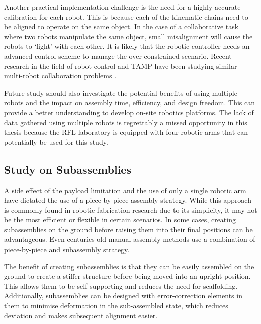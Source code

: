 Another practical implementation challenge is the need for a highly accurate calibration for each robot. This is because each of the kinematic chains need to be aligned to operate on the same object. In the case of a collaborative task where two robots manipulate the same object, small misalignment will cause the robots to ‘fight’ with each other. It is likely that the robotic controller needs an advanced control scheme to manage the over-constrained scenario. Recent research in the field of robot control and TAMP have been studying similar multi-robot collaboration problems \parencite{stroupeBehaviorbasedMultirobotCollaboration2005}.

Future study should also investigate the potential benefits of using multiple robots and the impact on assembly time, efficiency, and design freedom. This can provide a better understanding to develop on-site robotics platforms. The lack of data gathered using multiple robots is regrettably a missed opportunity in this thesis because the RFL laboratory is equipped with four robotic arms that can potentially be used for this study. 

\subsection{Study on Subassemblies}
\label{subsection:study-on-subassemblies}

A side effect of the payload limitation and the use of only a single robotic arm have dictated the use of a piece-by-piece assembly strategy. While this approach is commonly found in robotic fabrication research due to its simplicity, it may not be the most efficient or flexible in certain scenarios. In some cases, creating subassemblies on the ground before raising them into their final positions can be advantageous. Even centuries-old manual assembly methods use a combination of piece-by-piece and subassembly strategy.

The benefit of creating subassemblies is that they can be easily assembled on the ground to create a stiffer structure before being moved into an upright position. This allows them to be self-supporting and reduces the need for scaffolding. Additionally, subassemblies can be designed with error-correction elements in them to minimise deformation in the sub-assembled state, which reduces deviation and makes subsequent alignment easier.

